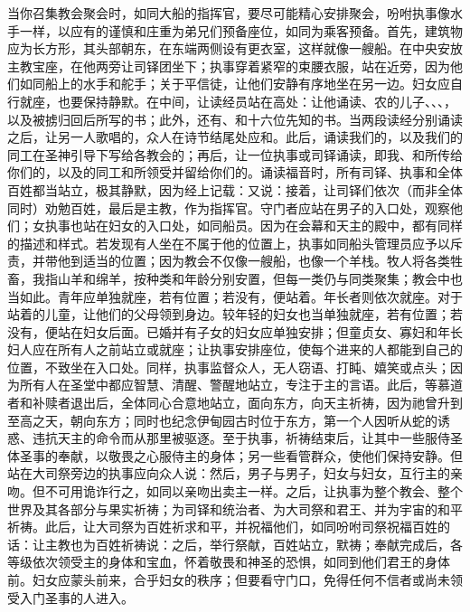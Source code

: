 当你召集教会聚会时，如同大船的指挥官，要尽可能精心安排聚会，吩咐执事像水手一样，以应有的谨慎和庄重为弟兄们预备座位，如同为乘客预备。首先，建筑物应为长方形，其头部朝东，在东端两侧设有更衣室，这样就像一艘船。在中央安放主教宝座，在他两旁让司铎团坐下；执事穿着紧窄的束腰衣服，站在近旁，因为他们如同船上的水手和舵手；关于平信徒，让他们安静有序地坐在另一边。妇女应自行就座，也要保持静默。在中间，让读经员站在高处：让他诵读、农的儿子、、、，以及被掳归回后所写的书；此外，还有、和十六位先知的书。当两段读经分别诵读之后，让另一人歌唱的，众人在诗节结尾处应和。此后，诵读我们的，以及我们的同工在圣神引导下写给各教会的；再后，让一位执事或司铎诵读，即我、和所传给你们的，以及的同工和所领受并留给你们的。诵读福音时，所有司铎、执事和全体百姓都当站立，极其静默，因为经上记载：又说：接着，让司铎们依次（而非全体同时）劝勉百姓，最后是主教，作为指挥官。守门者应站在男子的入口处，观察他们；女执事也站在妇女的入口处，如同船员。因为在会幕和天主的殿中，都有同样的描述和样式。若发现有人坐在不属于他的位置上，执事如同船头管理员应予以斥责，并带他到适当的位置；因为教会不仅像一艘船，也像一个羊栈。牧人将各类牲畜，我指山羊和绵羊，按种类和年龄分别安置，但每一类仍与同类聚集；教会中也当如此。青年应单独就座，若有位置；若没有，便站着。年长者则依次就座。对于站着的儿童，让他们的父母领到身边。较年轻的妇女也当单独就座，若有位置；若没有，便站在妇女后面。已婚并有子女的妇女应单独安排；但童贞女、寡妇和年长妇人应在所有人之前站立或就座；让执事安排座位，使每个进来的人都能到自己的位置，不致坐在入口处。同样，执事监督众人，无人窃语、打盹、嬉笑或点头；因为所有人在圣堂中都应智慧、清醒、警醒地站立，专注于主的言语。此后，等慕道者和补赎者退出后，全体同心合意地站立，面向东方，向天主祈祷，因为祂曾升到至高之天，朝向东方；同时也纪念伊甸园古时位于东方，第一个人因听从蛇的诱惑、违抗天主的命令而从那里被驱逐。至于执事，祈祷结束后，让其中一些服侍圣体圣事的奉献，以敬畏之心服侍主的身体；另一些看管群众，使他们保持安静。但站在大司祭旁边的执事应向众人说：然后，男子与男子，妇女与妇女，互行主的亲吻。但不可用诡诈行之，如同以亲吻出卖主一样。之后，让执事为整个教会、整个世界及其各部分与果实祈祷；为司铎和统治者、为大司祭和君王、并为宇宙的和平祈祷。此后，让大司祭为百姓祈求和平，并祝福他们，如同吩咐司祭祝福百姓的话：让主教也为百姓祈祷说：之后，举行祭献，百姓站立，默祷；奉献完成后，各等级依次领受主的身体和宝血，怀着敬畏和神圣的恐惧，如同到他们君王的身体前。妇女应蒙头前来，合乎妇女的秩序；但要看守门口，免得任何不信者或尚未领受入门圣事的人进入。\par

